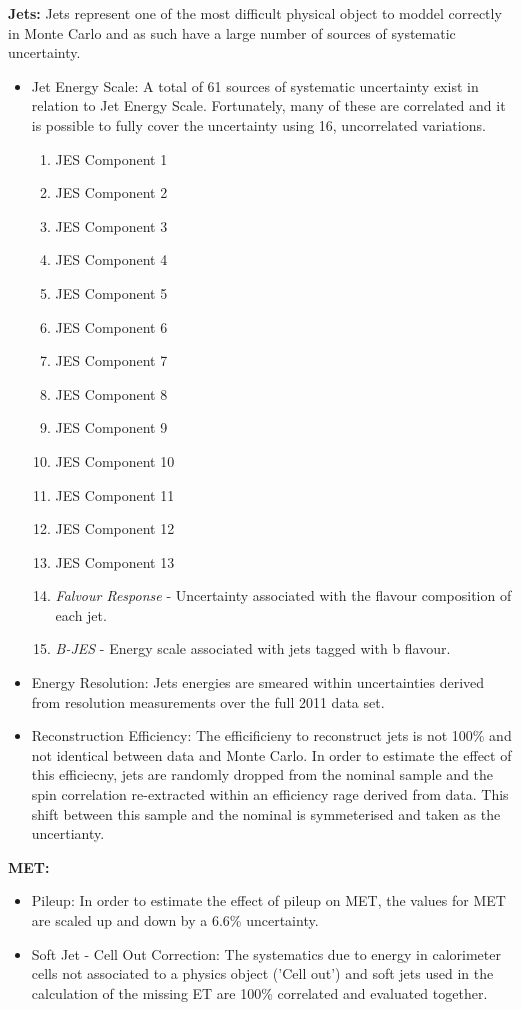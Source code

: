\vspace{5mm}
\noindent
\textbf{Jets:}
Jets represent one of the most difficult physical object to moddel correctly in Monte Carlo and as such have a large number of sources of systematic uncertainty. 
\begin{itemize}
    \item Jet Energy Scale: A total of 61 sources of systematic uncertainty exist in relation to Jet Energy Scale. Fortunately, many of these are correlated and it is possible to fully cover the uncertainty using 16, uncorrelated variations.
	\begin{enumerate}
	\item JES Component 1
	\item JES Component 2
	\item JES Component 3
	\item JES Component 4
	\item JES Component 5
	\item JES Component 6
	\item JES Component 7
	\item JES Component 8
	\item JES Component 9	
	\item JES Component 10
	\item JES Component 11	
	\item JES Component 12
	\item JES Component 13	
	\item \textit{Falvour Response} - Uncertainty associated with the flavour composition of each jet.
	\item \textit{B-JES} - Energy scale associated with jets tagged with b flavour.
	\end{enumerate}	
    \item Energy Resolution: Jets energies are smeared within uncertainties derived from resolution measurements over the full 2011 data set. 
    \item Reconstruction Efficiency: The efficificieny to reconstruct jets is not 100\% and not identical between data and Monte Carlo. In order to estimate the effect of this efficiecny, jets are randomly dropped from the nominal sample and the spin correlation re-extracted within an efficiency rage derived from data. This shift between this sample and the nominal is symmeterised and taken as the uncertianty.
\end{itemize}

\vspace{5mm}
\noindent
\textbf{MET:}
\begin{itemize}
    \item Pileup: In order to estimate the effect of pileup on MET, the values for MET are scaled up and down by a 6.6\% uncertainty. 
    \item Soft Jet - Cell Out Correction: The systematics due to energy in calorimeter cells not associated to a physics object ('Cell out') and soft jets used in the calculation of the missing ET are 100\% correlated and evaluated together. 
\end{itemize}


